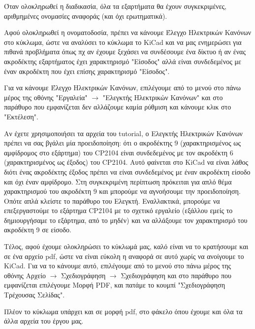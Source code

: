 \documentclass[a4paper]{article}
\begin{document}
Όταν ολοκληρωθεί η διαδικασία, όλα τα εξαρτήματα θα έχουν συγκεκριμένες, αριθμημένες ονομασίες αναφοράς (και όχι ερωτηματικά).

Αφού ολοκληρωθεί η ονοματοδοσία, πρέπει να κάνουμε Έλεγχο Ηλεκτρικών Κανόνων στο κύκλωμα, ώστε να αναλύσει το κύκλωμα το \textenglish{KiCad} και να μας ενημερώσει για πιθανά προβλήματα όπως πχ αν έχουμε ξεχάσει να συνδέσουμε ένα δίκτυο ή αν ένας ακροδέκτης εξαρτήματος έχει χαρακτηρισμό "Είσοδος" αλλά είναι συνδεδεμένος με έναν ακροδέκτη που έχει επίσης χαρακτηρισμό "Είσοδος".

Για να κάνουμε Έλεγχο Ηλεκτρικών Κανόνων, επιλέγουμε από το μενού στο πάνω μέρος της οθόνης "Εργαλεία" $\rightarrow$ "Ελεγκτής Ηλεκτρικών Κανόνων" και στο παράθυρο που εμφανίζεται δεν αλλάζουμε καμία ρύθμιση και κάνουμε κλικ στο "Εκτέλεση". 

Αν έχετε χρησιμοποιήσει τα αρχεία του tutorial, ο Ελεγκτής Ηλεκτρικών Κανόνων πρέπει να σας βγάλει μία προειδοποίηση: ότι ο ακροδέκτης 9 (χαρακτηρισμένος ως αμφίδρομος στο εξάρτημα) του \textenglish{CP2104} είναι συνδεδεμένος με τον ακροδέκτη 6 (χαρακτηρισμένος ως έξοδος) του \textenglish{CP2104}. Αυτό φαίνεται στο \textenglish{KiCad} να είναι λάθος διότι ένας ακροδέκτης έξοδος πρέπει να είναι συνδεδεμένος με έναν ακροδέκτη είσοδο και όχι έναν αμφίδρομο. Στη συγκεκριμένη περίπτωση πρόκειται για απλό θέμα χαρακτηρισμού του ακροδέκτη 9 και μπορούμε να αγνοήσουμε την προειδοποίηση. Οπότε απλά κλείστε το παράθυρο του Ελεγκτή.
Εναλλακτικά, μπορούμε να επεξεργαστούμε το εξάρτημα \textenglish{CP2104} με το σχετικό εργαλείο (εξάλλου εμείς το δημιουργήσαμε το εξάρτημα, από το μηδέν) και να αλλάξουμε τον χαρακτηρισμό του ακροδέκτη 9 σε είσοδο.

Τέλος, αφού έχουμε ολοκληρώσει το κύκλωμά μας, καλό είναι να το κρατήσουμε και σε ένα αρχείο pdf, ώστε να είναι εύκολη η αναφορά σε αυτό χωρίς να ανοίγουμε το \textenglish{KiCad}. Για να το κάνουμε αυτό, επιλέγουμε από το μενού στο πάνω μέρος της οθόνης Αρχείο $\rightarrow$ Σχεδιογράφηση $\rightarrow$ Σχεδιογράφηση και στο παράθυρο που εμφανίζεται επιλέγουμε Μορφή PDF, και πατάμε το κουμπί "Σχεδιογράφηση Τρέχουσας Σελίδας". 

\begin{figure}
  \begin{center}
    \label{fig:kicad-main}
  \end{center}
\end{figure}

Πλέον το κύκλωμα υπάρχει και σε μορφή pdf, στο φάκελο όπου έχουμε και όλα τα άλλα αρχεία του έργου μας.
\end{document}
